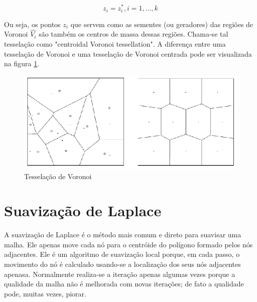 \begin{equation}
    z_i = z_i^*, i=1,...,k
\end{equation}

Ou seja, os pontos $z_i$ que servem como as sementes (ou geradores) das regiões de Voronoi $\hat{V_i}$ são também os centros de massa dessas regiões. Chama-se tal tesselação como "centroidal Voronoi tessellation". A diferença entre uma tesselação de Voronoi e uma tesselação de Voronoi centrada pode ser visualizada na figura \ref{fig:voronoi_tessellation}.

\begin{figure}
    \centering
    \includegraphics{fig/voronoi_tessellation.eps}
    \caption[Tesselação de Voronoi]{Tesselação de Voronoi}
    \label{fig:voronoi_tessellation}
\end{figure}



\section{Suavização de Laplace}

A suavização de Laplace é o método mais comum e direto para suavisar uma malha. Ele apenas move cada nó para o centróide do polígono formado pelos nós adjacentes. Ele é um algoritmo de suavização local porque, em cada passo, o movimento do nó é calculado usando-se a localização dos seus nós adjacentes apenasa. Normalmente realiza-se a iteração apenas algumas vezes porque a qualidade da malha não é melhorada com novas iterações; de fato a qualidade pode, muitas vezes, piorar. \cite{Zhou}

